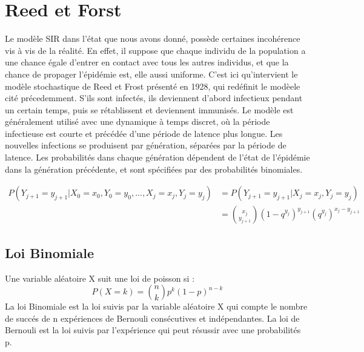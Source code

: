 \section{Reed et Forst}

Le modèle SIR dans l’état que nous avons donné, possède certaines incohérence vis à vis
de la réalité. En effet, il suppose que chaque individu de la population a une chance égale d'entrer
en contact avec tous les autres individus, et que la chance de propager l’épidémie est, elle aussi uniforme.
C’est ici qu’intervient le modèle stochastique de Reed et Frost présenté en 1928, qui redéfinit le
modèele cité précedemment. S'ils sont infectés, ils deviennent d'abord infectieux pendant un certain
temps, puis se rétablissent et deviennent immunisés. Le modèle est généralement utilisé avec une
dynamique à temps discret, où la période infectieuse est courte et précédée d'une période de latence
plus longue. Les nouvelles infections se produisent par génération, séparées par la période de
latence. Les probabilités dans chaque génération dépendent de l'état de l'épidémie dans la
génération précédente, et sont spécifiées par des probabilités binomiales.

\begin{align}
P(Y_{j+1} = y_{j+1} | X_0 = x_0, Y_0 = y_0, ..., X_j = x_j, Y_j = y_j) &= P(Y_{j+1} = y_{j+1} | X_j = x_j, Y_j = y_j) \\
&= \binom{x_j}{y_{j+1}}(1 - q^{y_j})^{y_{j+1}}(q^{y_j})^{x_j - y_{j+1}}
\end{align}

\subsection{Loi Binomiale}

Une variable aléatoire X suit une loi de poisson si :
$$ P(X = k) = \binom{n}{k}p^k(1 - p)^{n-k} $$
La loi Binomiale est la loi suivis par la variable aléatoire X qui compte le nombre de succés de n expériences de Bernouli consécutives et indépendantes.
La loi de Bernouli est la loi suivis par l'expérience qui peut résussir avec une probabilités p.


